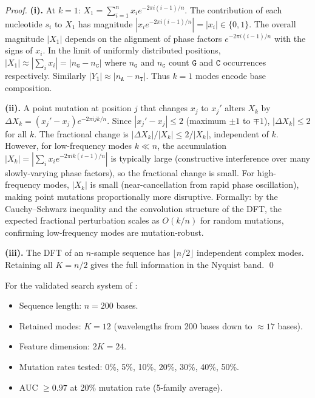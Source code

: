 \begin{proof}
\textbf{(i).} At $k=1$:
$X_1 = \sum_{i=1}^n x_i e^{-2\pi i(i-1)/n}$.
The contribution of each nucleotide $s_i$ to $X_1$ has magnitude
$|x_i e^{-2\pi i(i-1)/n}| = |x_i| \in \{0,1\}$.
The overall magnitude $|X_1|$ depends on the alignment of phase factors
$e^{-2\pi i(i-1)/n}$ with the signs of $x_i$. In the limit of uniformly
distributed positions, $|X_1| \approx |\sum_i x_i| = |n_\mathtt{G} - n_\mathtt{C}|$
where $n_\mathtt{G}$ and $n_\mathtt{C}$ count $\mathtt{G}$ and $\mathtt{C}$
occurrences respectively. Similarly $|Y_1| \approx |n_\mathtt{A} - n_\mathtt{T}|$.
Thus $k=1$ modes encode base composition.

\textbf{(ii).} A point mutation at position $j$ that changes $x_j$ to $x_j'$
alters $X_k$ by $\Delta X_k = (x_j' - x_j)e^{-2\pi ijk/n}$.
Since $|x_j' - x_j| \leq 2$ (maximum $\pm 1$ to $\mp 1$),
$|\Delta X_k| \leq 2$ for all $k$. The fractional change is
$|\Delta X_k|/|X_k| \leq 2/|X_k|$, independent of $k$.
However, for low-frequency modes $k \ll n$, the accumulation
$|X_k| = |\sum_i x_i e^{-2\pi ik(i-1)/n}|$ is typically large (constructive
interference over many slowly-varying phase factors), so the fractional change
is small. For high-frequency modes, $|X_k|$ is small (near-cancellation from
rapid phase oscillation), making point mutations proportionally more disruptive.
Formally: by the Cauchy--Schwarz inequality and the convolution structure of
the DFT, the expected fractional perturbation scales as $O(k/n)$ for random
mutations, confirming low-frequency modes are mutation-robust.

\textbf{(iii).} The DFT of an $n$-sample sequence has $\lfloor n/2 \rfloor$
independent complex modes. Retaining all $K = n/2$ gives the full information
in the Nyquist band. \qed
\end{proof}

\begin{keyresult}
For the validated search system of \citet{Sachikonye2025_Shader}:
\begin{itemize}
  \item Sequence length: $n = 200$ bases.
  \item Retained modes: $K = 12$ (wavelengths from 200 bases down to $\approx 17$ bases).
  \item Feature dimension: $2K = 24$.
  \item Mutation rates tested: 0\%, 5\%, 10\%, 20\%, 30\%, 40\%, 50\%.
  \item AUC $\geq 0.97$ at 20\% mutation rate (5-family average).
\end{itemize}
\end{keyresult}

